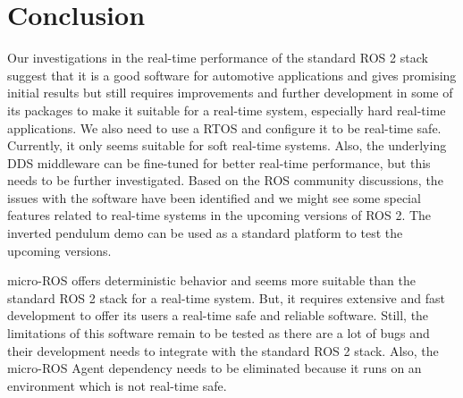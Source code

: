 \documentclass[%
xelatex,
	oneside,		%
	12pt,			%
	parskip=half,	%
	abstracton,
	chapterprefix=true%
    appendixprefix=true]
{scrbook}
\begin{document}
		\chapter{Conclusion}
			
\rofoot[\pagemark]{\pagemark}
Our investigations in the real-time performance of the standard ROS 2 stack suggest that it is a good software for automotive applications and gives promising initial results but still requires improvements and further development in some of its packages to make it suitable for a real-time system, especially hard real-time applications. We also need to use a RTOS and configure it to be real-time safe. Currently, it only seems suitable for soft real-time systems. Also, the underlying DDS middleware can be fine-tuned for better real-time performance, but this needs to be further investigated. Based on the ROS community discussions, the issues with the software have been identified and we might see some special features related to real-time systems in the upcoming versions of ROS 2. The inverted pendulum demo can be used as a standard platform to test the upcoming versions.

\vspace*{0.5cm}
micro-ROS offers deterministic behavior and seems more suitable than the standard ROS 2 stack for a real-time system. But, it requires extensive and fast development to offer its users a real-time safe and reliable software. Still, the limitations of this software remain to be tested as there are a lot of bugs and their development needs to integrate with the standard ROS 2 stack. Also, the micro-ROS Agent dependency needs to be eliminated because it runs on an environment which is not real-time safe.
\end{document}
